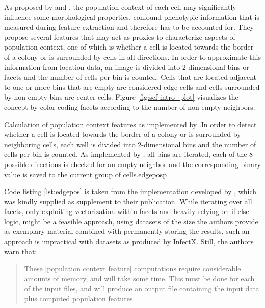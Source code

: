 \label{ex:efficiency}
As proposed by \cite{Knapp2011} and \cite{Snijder2012}, the population context of each cell may significantly influence some morphological properties, confound phenotypic information that is measured during feature extraction and therefore has to be accounted for. They propose several features that may act as proxies to characterize aspects of population context, one of which is whether a cell is located towards the border of a colony or is surrounded by cells in all directions. In order to approximate this information from location data, an image is divided into 2-dimensional bins or facets and the number of cells per bin is counted. Cells that are located adjacent to one or more bins that are empty are considered edge cells and cells surrounded by non-empty bins are center cells. Figure \ref{fig:scf-intro_plot} visualizes the concept by color-coding facets according to the number of non-empty neighbors.

\begin{rlisting}{Calculation of population context features as implemented by \citeauthor{Knapp2011}.}{In order to detect whether a cell is located towards the border of a colony or is surrounded by neighboring cells, each well is divided into 2-dimensional bins and the number of cells per bin is counted. As implemented by \citeauthor{Knapp2011}, all bins are iterated, each of the 8 possible directions is checked for an empty neighbor and the corresponding binary value is saved to the current group of cells.}{edgepos}{p}

\end{rlisting}

Code listing \ref{lst:edgepos} is taken from the implementation developed by \citeauthor{Knapp2011}, which was kindly supplied as supplement to their publication. While iterating over all facets, only exploiting vectorization within facets and heavily relying on if-else logic, might be a feasible approach, using datasets of the size the authors provide as exemplary material combined with permanently storing the results, such an approach is impractical with datasets as produced by InfectX. Still, the authors warn that:

\begin{quote}
These [population context feature] computations require considerable amounts of memory, and will take some time. This must be done for each of the input files, and will produce an output file containing the input data plus computed population features.
\end{quote}

